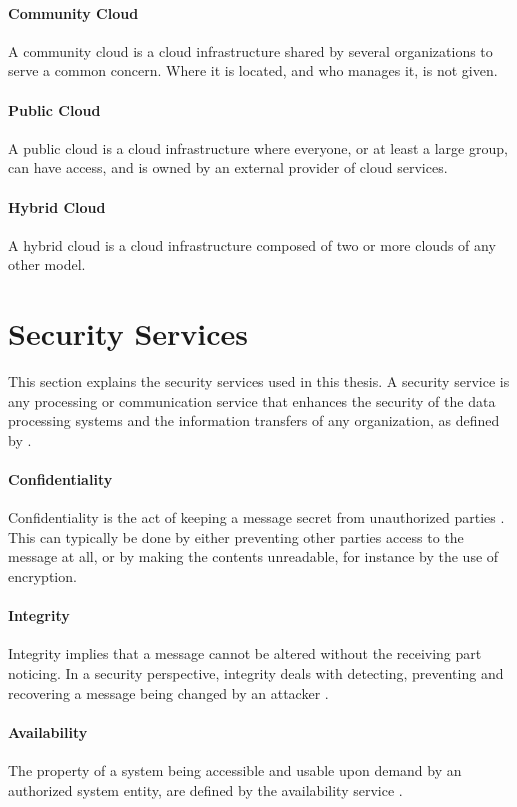 \documentclass[pdftex,english,10pt,b5paper,twoside]{book}
\begin{document}
\paragraph{Community Cloud} A community cloud is a cloud infrastructure shared
by several organizations to serve a common concern. Where it is located, and
who manages it, is not given.

\paragraph{Public Cloud} A public cloud is a cloud infrastructure where
everyone, or at least a large group, can have access, and is owned by an external
provider of cloud services.

\paragraph{Hybrid Cloud} A hybrid cloud is a cloud infrastructure composed of
two or more clouds of any other model.


\section{Security Services}

This section explains the security services used in this thesis. A security
service is any processing or communication service that enhances the security
of the data processing systems and the information transfers of any
organization, as defined by \citet[p. 12]{stallings}.

\paragraph{Confidentiality} Confidentiality is the act of keeping a message
secret from unauthorized parties \cite[p. 18]{stallings}. This can typically be
done by either preventing other parties access to the message at all, or by making
the contents unreadable, for instance by the use of encryption.

\paragraph{Integrity} Integrity implies that a message cannot be altered
without the receiving part noticing. In a security perspective, integrity deals
with detecting, preventing and recovering a message being changed by an
attacker \cite{stallings}.

\paragraph{Availability} The property of a system being accessible and usable
upon demand by an authorized system entity, are defined by the availability
service \cite{stallings}.
\end{document}
